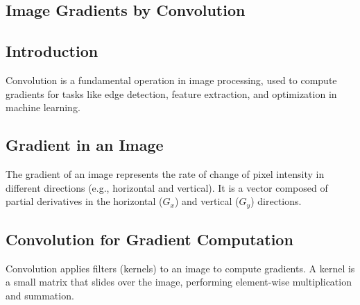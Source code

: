 \begin{notechapter}
\chapter{Image Gradients by Convolution}\label{ch:image-gradients}

\section{Introduction}
Convolution is a fundamental operation in image processing,
used to compute gradients for tasks like edge detection,
feature extraction, and optimization in machine learning.

\section{Gradient in an Image}
The gradient of an image represents the rate of change of
pixel intensity in different directions (e.g., horizontal
and vertical). It is a vector composed of partial derivatives
in the horizontal ($G_x$) and vertical ($G_y$) directions.

\section{Convolution for Gradient Computation}
Convolution applies filters (kernels) to an image to compute
gradients. A kernel is a small matrix that slides over the
image, performing element-wise multiplication and summation.


\end{notechapter}
